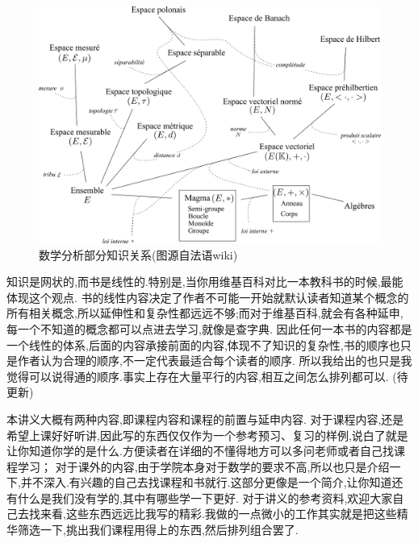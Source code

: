 \documentclass[12pt, a4paper, oneside]{ctexbook}
\begin{document}
\begin{figure}[H]%
  \centering
  \includegraphics[scale=0.5]{abstract.png}
  \caption{数学分析部分知识关系(图源自法语wiki)}
  \label{myref:abstract}
\end{figure}

知识是网状的,而书是线性的.特别是,当你用维基百科对比一本教科书的时候,最能体现这个观点.
书的线性内容决定了作者不可能一开始就默认读者知道某个概念的所有相关概念,所以延伸性和复杂性都远远不够;而对于维基百科,就会有各种延申,每一个不知道的概念都可以点进去学习,就像是查字典.
因此任何一本书的内容都是一个线性的体系,后面的内容承接前面的内容,体现不了知识的复杂性,书的顺序也只是作者认为合理的顺序,不一定代表最适合每个读者的顺序.
所以我给出的也只是我觉得可以说得通的顺序.事实上存在大量平行的内容,相互之间怎么排列都可以.
(待更新)

本讲义大概有两种内容,即课程内容和课程的前置与延申内容.
对于课程内容,还是希望上课好好听讲,因此写的东西仅仅作为一个参考预习、复习的样例,说白了就是让你知道你学的是什么.方便读者在详细的不懂得地方可以多问老师或者自己找课程学习；
对于课外的内容,由于学院本身对于数学的要求不高,所以也只是介绍一下,并不深入.有兴趣的自己去找课程和书就行.这部分更像是一个简介,让你知道还有什么是我们没有学的,其中有哪些学一下更好.
对于讲义的参考资料,欢迎大家自己去找来看,这些东西远远比我写的精彩.我做的一点微小的工作其实就是把这些精华筛选一下,挑出我们课程用得上的东西,然后排列组合罢了.\\
\end{document}
